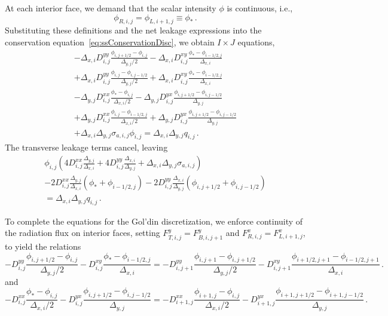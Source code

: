 At each interior face, we demand that the scalar intensity $\phi$ is continuous,
i.e.,
\begin{equation*}
  \phi_{R,i,j} = \phi_{L,i+1,j} \equiv \phi_*\,.
\end{equation*}
Substituting these definitions and the net leakage expressions into the
conservation equation~\eqref{eq:ssConservationDisc}, we obtain $I\times J$
equations,
\begin{multline*}
- \Delta_{x,i} D_{i,j}^{yy}\frac{\phi_{i,j+1/2} - \phi_{i,j}}{\Delta_{y,j} / 2}
- \Delta_{x,i} D_{i,j}^{xy}\frac{\phi_* - \phi_{i-1/2,j}}{\Delta_{x,i} }
\\
+ \Delta_{x,i} D_{i,j}^{yy}\frac{\phi_{i,j} - \phi_{i,j-1/2}}{\Delta_{y,j} / 2}
+ \Delta_{x,i} D_{i,j}^{xy}\frac{\phi_* - \phi_{i-1/2,j}}{\Delta_{x,i} }
\\
- \Delta_{y,j} D_{i,j}^{xx}\frac{\phi_* - \phi_{i,j}}{\Delta_{x,i} / 2}
- \Delta_{y,j} D_{i,j}^{yx}\frac{\phi_{i,j+1/2} - \phi_{i,j-1/2}}{\Delta_{y,j} }
\\
+ \Delta_{y,j} D_{i,j}^{xx}\frac{\phi_{i,j} - \phi_{i-1/2,j}}{\Delta_{x,i} / 2}
+ \Delta_{y,j} D_{i,j}^{yx}\frac{\phi_{i,j+1/2} - \phi_{i,j-1/2}}{\Delta_{y,j} }
\\
+ \Delta_{x,i}\Delta_{y,j} \sigma_{a,i,j} \phi_{i,j}
= \Delta_{x,i}\Delta_{y,j} q_{i,j}\,.
\end{multline*}
The transverse leakage terms cancel, leaving
\begin{multline*}
\phi_{i,j} \left(
   4 D_{i,j}^{xx} \frac{\Delta_{y,j}}{\Delta_{x,i}}
 + 4 D_{i,j}^{yy} \frac{\Delta_{x,i}}{\Delta_{y,j}}
 + \Delta_{x,i}\Delta_{y,j} \sigma_{a,i,j} \right)
 \\
- 2 D_{i,j}^{xx} \frac{\Delta_{y,j}}{\Delta_{x,i}}
  \left( \phi_* + \phi_{i-1/2,j} \right)
- 2 D_{i,j}^{yy} \frac{\Delta_{x,i}}{\Delta_{y,j}}
  \left( \phi_{i,j+1/2} + \phi_{i,j-1/2} \right)
\\= \Delta_{x,i}\Delta_{y,j} q_{i,j}\,.
\end{multline*}

To complete the equations for the Gol'din discretization, we enforce continuity
of the radiation flux on interior faces, setting $F_{T,i,j}^y = F_{B,i,j+1}^y$
and $F_{R,i,j}^x = F_{L,i+1,j}^x$, to yield the relations
\begin{equation*}
- D_{i,j}^{yy} \frac{\phi_{i,j+1/2} - \phi_{i,j}}{ \Delta_{y,j} / 2}
- D_{i,j}^{xy} \frac{\phi_* - \phi_{i-1/2,j}}{ \Delta_{x,i} }
=
- D_{i,j+1}^{yy} \frac{\phi_{i,j+1} - \phi_{i,j+1/2}}{ \Delta_{y,j} / 2}
- D_{i,j+1}^{xy} \frac{\phi_{i+1/2,j+1} - \phi_{i-1/2,j+1}}{ \Delta_{x,i} }\,.
\end{equation*}
and
\begin{equation*}
- D_{i,j}^{xx} \frac{\phi_* - \phi_{i,j}}{ \Delta_{x,i} / 2}
- D_{i,j}^{yx} \frac{\phi_{i,j+1/2} - \phi_{i,j-1/2}}{ \Delta_{y,j} }
=
- D_{i+1,j}^{xx} \frac{\phi_{i+1,j} - \phi_{i,j}}{ \Delta_{x,i} / 2}
- D_{i+1,j}^{yx} \frac{\phi_{i+1,j+1/2} - \phi_{i+1,j-1/2}}{ \Delta_{y,j} }\,.
\end{equation*}

